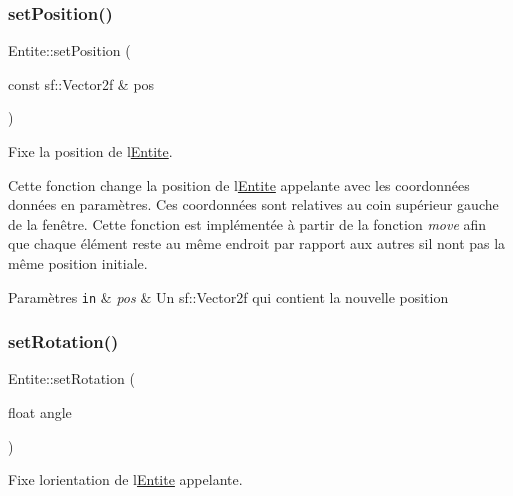\mbox{\label{class_entite_aa7fe4a7ebd8eb4c80ef9fdb7d97f2dad}} 
\subsubsection{\texorpdfstring{set\+Position()}{setPosition()}}
{\footnotesize\ttfamily Entite\+::set\+Position (\begin{DoxyParamCaption}\item[{const sf\+::\+Vector2f \&}]{pos }\end{DoxyParamCaption})}



Fixe la position de l\textquotesingle{}\hyperlink{class_entite}{Entite}. 

Cette fonction change la position de l\textquotesingle{}\hyperlink{class_entite}{Entite} appelante avec les coordonnées données en paramètres. Ces coordonnées sont relatives au coin supérieur gauche de la fenêtre. Cette fonction est implémentée à partir de la fonction {\itshape move} afin que chaque élément reste au même endroit par rapport aux autres s\textquotesingle{}il n\textquotesingle{}ont pas la même position initiale. 
\begin{DoxyParams}[1]{Paramètres}
\mbox{\tt in}  & {\em pos} & Un {\ttfamily sf\+::\+Vector2f} qui contient la nouvelle position \\
\hline
\end{DoxyParams}
\mbox{\label{class_entite_a8623ac815e34b553098f45696ea8918b}} 
\subsubsection{\texorpdfstring{set\+Rotation()}{setRotation()}}
{\footnotesize\ttfamily Entite\+::set\+Rotation (\begin{DoxyParamCaption}\item[{float}]{angle }\end{DoxyParamCaption})}



Fixe l\textquotesingle{}orientation de l\textquotesingle{}\hyperlink{class_entite}{Entite} appelante. 

